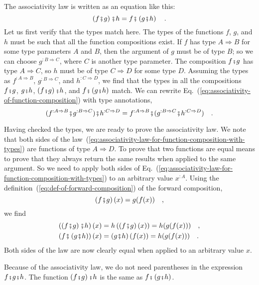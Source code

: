 The associativity law is written as an equation like this:
\begin{equation}
\left(f\bef g\right)\bef h=f\bef\left(g\bef h\right)\quad.\label{eq:associativity-of-function-composition}
\end{equation}
Let us first verify that the types match here. The types of the functions
$f$, $g$, and $h$ must be such that all the function compositions
exist. If $f$ has type $A\Rightarrow B$ for some type parameters
$A$ and $B$, then the argument of $g$ must be of type $B$; so
we can choose $g^{:B\Rightarrow C}$, where $C$ is another type parameter.
The composition $f\bef g$ has type $A\Rightarrow C$, so $h$ must
be of type $C\Rightarrow D$ for some type $D$. Assuming the types
as $f^{:A\Rightarrow B}$, $g^{:B\Rightarrow C}$, and $h^{:C\Rightarrow D}$,
we find that the types in all the compositions $f\bef g$, $g\bef h$,
$\left(f\bef g\right)\bef h$, and $f\bef\left(g\bef h\right)$ match.
We can rewrite Eq.~(\ref{eq:associativity-of-function-composition})
with type annotations, 
\begin{equation}
(f^{:A\Rightarrow B}\bef g^{:B\Rightarrow C})\bef h^{:C\Rightarrow D}=f^{:A\Rightarrow B}\bef(g^{:B\Rightarrow C}\bef h^{:C\Rightarrow D})\quad.\label{eq:associativity-law-for-function-composition-with-types}
\end{equation}

Having checked the types, we are ready to prove the associativity
law. We note that both sides of the law~(\ref{eq:associativity-law-for-function-composition-with-types})
are functions of type $A\Rightarrow D$. To prove that two functions
are equal means to prove that they always return the same results
when applied to the same argument. So we need to apply both sides
of Eq.~(\ref{eq:associativity-law-for-function-composition-with-types})
to an arbitrary value $x^{:A}$. Using the definition~(\ref{eq:def-of-forward-composition})
of the forward composition, 
\[
\left(f\bef g\right)(x)=g(f(x))\quad,
\]
we find
\begin{align*}
\left(\left(f\bef g\right)\bef h\right)(x) & =h\left(\left(f\bef g\right)(x)\right)=h(g(f(x)))\quad,\\
\left(f\bef\left(g\bef h\right)\right)(x) & =\left(g\bef h\right)(f(x))=h(g(f(x)))\quad.
\end{align*}
Both sides of the law are now clearly equal when applied to an arbitrary
value $x$.

Because of the associativity law, we do not need parentheses in the
expression $f\bef g\bef h$. The function $\left(f\bef g\right)\bef h$
is the same as $f\bef\left(g\bef h\right)$.

